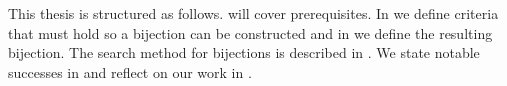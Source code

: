 This thesis is structured as follows.  will cover prerequisites. In  we define criteria that must hold so a bijection can be constructed and in  we define the resulting bijection. The search method for bijections is described in . We state notable successes in  and reflect on our work in .
